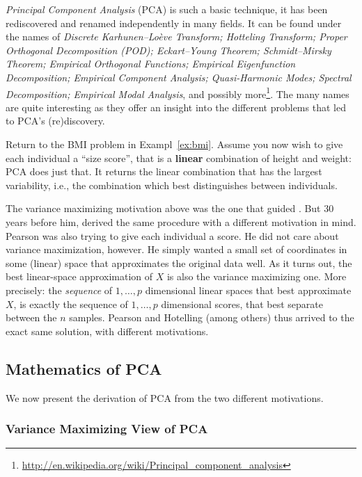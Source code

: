 \documentclass[12pt,a4paper]{article}
\begin{document}
\emph{Principal Component Analysis} (PCA) is such a basic technique, it has been rediscovered and renamed independently in many fields. 
It can be found under the names of 
\emph{
	Discrete Karhunen–Loève Transform; 
	Hotteling Transform; 
	Proper Orthogonal Decomposition (POD); 
	Eckart–Young Theorem; 
	Schmidt–Mirsky Theorem;  
	Empirical Orthogonal Functions; 
	Empirical Eigenfunction Decomposition;  
	Empirical Component Analysis;  
	Quasi-Harmonic Modes;  
	Spectral Decomposition;  
	Empirical Modal Analysis}, 
and possibly more\footnote{\url{http://en.wikipedia.org/wiki/Principal_component_analysis} }.
The many names are quite interesting as they offer an insight into the different problems that led to PCA's (re)discovery.


Return to the BMI problem in Exampl~\ref{ex:bmi}.
Assume you now wish to give each individual a ``size score'', that is a \textbf{linear} combination of height and weight: PCA does just that. 
It returns the linear combination that has the largest variability, i.e., the combination which best distinguishes between individuals. 

The variance maximizing motivation above was the one that guided \citet{hotelling1933analysis}.
But $30$ years before him, \citet{pearson1901liii} derived the same procedure with a different motivation in mind. 
Pearson was also trying to give each individual a score. 
He did not care about variance maximization, however. 
He simply wanted a small set of coordinates in some (linear) space that approximates the original data well. 
As it turns out, the best linear-space approximation of $X$ is also the variance maximizing one. 
More precisely: the \emph{sequence} of $1,\dots,p$ dimensional linear spaces that best approximate $X$, is exactly the sequence of $1,\dots,p$ dimensional scores, that best separate between the $n$ samples. 
Pearson and Hotelling (among others) thus arrived to the exact same solution, with different motivations. 






\subsection{Mathematics of PCA}
\label{sec:pca_mathematics}
We now present the derivation of PCA from the two different motivations.

\subsubsection{Variance Maximizing View of PCA}
\end{document}
